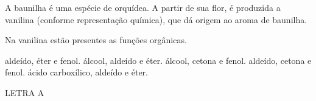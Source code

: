 \documentclass[10pt]{scrartcl}
\date{\today}
\title{}
\def\disciplina{Química}
\begin{document}







\begin{exercise}[points=1.0]
A baunilha é uma espécie de orquídea. A partir de sua flor, é produzida a vanilina (conforme representação química), que dá origem ao aroma de baunilha.

\begin{center}
\end{center}


Na vanilina estão presentes as funções orgânicas.

\begin{choice}
\choice aldeído, éter e fenol.
\choice álcool, aldeído e éter.
\choice álcool, cetona e fenol.
\choice aldeído, cetona e fenol.
\choice ácido carboxílico, aldeído e éter.
\end{choice}
\end{exercise}
\begin{solution}
LETRA A
\end{solution}
\end{document}
